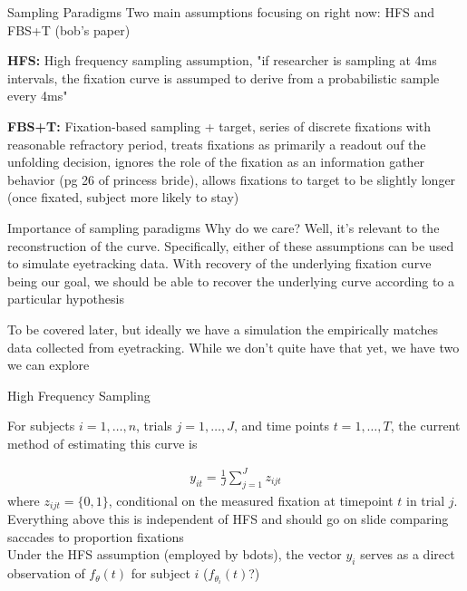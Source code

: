 \documentclass{beamer}
\begin{document}
\begin{frame}{Sampling Paradigms}
Two main assumptions focusing on right now: HFS and FBS+T (bob's paper) \newline

\textbf{HFS:} High frequency sampling assumption, "if researcher is sampling at 4ms intervals, the fixation curve is assumped to derive from a probabilistic sample every 4ms" \newline 

\textbf{FBS+T:} Fixation-based sampling + target, series of discrete fixations with reasonable refractory period, treats fixations as primarily a readout ouf the unfolding decision, ignores the role of the fixation as an information gather behavior (pg 26 of princess bride), allows fixations to target to be slightly longer (once fixated, subject more likely to stay)
\end{frame}

\begin{frame}{Importance of sampling paradigms}
Why do we care? Well, it's relevant to the reconstruction of the curve. Specifically, either of these assumptions can be used to simulate eyetracking data. With recovery of the underlying fixation curve being our goal, we should be able to recover the underlying curve according to a particular hypothesis \newline 

To be covered later, but ideally we have a simulation the empirically matches data collected from eyetracking. While we don't quite have that yet, we have two we can explore
\end{frame}

\begin{frame}{High Frequency Sampling}

For subjects $i = 1, \dots, n$, trials $j = 1, \dots, J$, and time points $t = 1, \dots, T$, the current method of estimating this curve is 

\begin{align*}
y_{it} = \frac{1}{J} \sum_{j=1}^J z_{ijt}
\end{align*}
where $z_{ijt} = \{0,1\}$, conditional on the measured fixation at timepoint $t$ in trial $j$. \newline \\
Everything above this is independent of HFS and should go on slide comparing saccades to proportion fixations \newline \\

Under the HFS assumption (employed by bdots), the vector $y_i$ serves as a direct observation of $f_{\theta}(t)$ for subject $i$ ($f_{\theta_i}(t)$?)
\end{frame}
\end{document}
